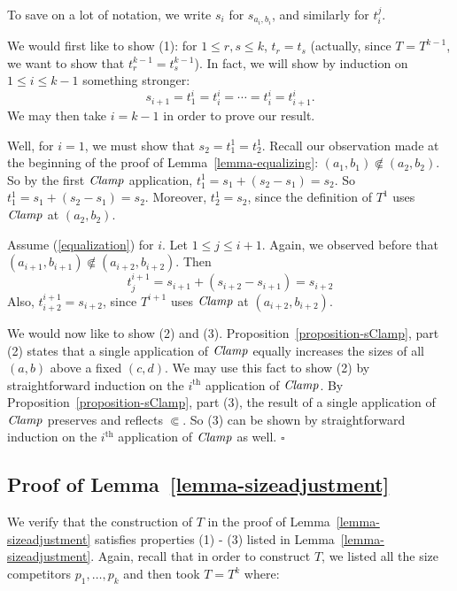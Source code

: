 \documentclass[letterpaper]{article} %
\theoremstyle{definition}
\newcommand{\Clamp}{\protect{\mbox{\textit{Clamp}}}}
\newcommand{\precsubseteq}{\Subset}
\begin{document}
To save on a lot of notation, we write $s_i$ for $s_{a_i, b_i}$,
and similarly for $t^j_i$.

We would first like to show (1): for $1 \leq r, s \leq k$, $t_{r} = t_{s}$ (actually, since $T = T^{k-1}$, we want to show that $t^{k-1}_{r} = t^{k-1}_{s}$).  In fact, we will show by induction on $1 \leq i \leq k - 1$ something stronger:
\begin{equation}
\label{equalization}
s_{i+1}  = t^i_{1} = t^i_{i} = \cdots = t^i_{i} =  t^i_{i+1}.
\end{equation}
We may then take $i = k - 1$ in order to prove our result.    

Well, for $i = 1$, we must show that $s_2 = t^1_1 = t^1_2$.  Recall our observation made at the beginning of the proof of Lemma~\ref{lemma-equalizing}:  $(a_1,b_1) \not \precsubseteq (a_2,b_2)$.  So by the first $\Clamp$ application, $t^1_1 = s_1 + (s_2 - s_1) = s_2$.
So $t^1_1 = s_1 + (s_2 - s_1) = s_2$.
Moreover, $t^1_2= s_2$, since the definition of $T^1$ uses $\Clamp$ at $(a_2,b_2)$.

Assume (\ref{equalization}) for  $i$.
Let   $1\leq j \leq i+1$.  Again, we observed before that $(a_{i+1},b_{i+1}) \not \precsubseteq (a_{i+2},b_{i+2})$.  Then
\[ t^{i+1}_j = s_{i+1} + (s_{i+2} - s_{i+1}) 
= s_{i+2}\]
Also, $t^{i+1}_{i+2} = s_{i+2} $, since $T^{i+1}$ uses $\Clamp$
at $(a_{i+2},b_{i+2})$.

We would now like to show (2) and (3).  Proposition~\ref{proposition-sClamp}, part (2) states that a single application of $\Clamp$ equally increases the sizes of all $(a, b)$ above a fixed $(c, d)$.  We may use this fact to show (2) by straightforward induction on the $i^{\textrm{th}}$ application of $\Clamp$.  By Proposition~\ref{proposition-sClamp}, part (3), the result of a single application of $\Clamp$ preserves and reflects $\Subset$.  So (3) can be shown by straightforward induction on the $i^{\textrm{th}}$ application of $\Clamp$ as well.  \hfill$\square$

\subsection*{Proof of Lemma~\ref{lemma-sizeadjustment}}

We verify that the construction of $T$ in the proof of Lemma~\ref{lemma-sizeadjustment} satisfies properties (1) - (3) listed in Lemma~\ref{lemma-sizeadjustment}.
Again, recall that in order to construct $T$, we listed all the size competitors $p_1, \ldots, p_k$ and then took $T = T^k$ where:
\end{document}
